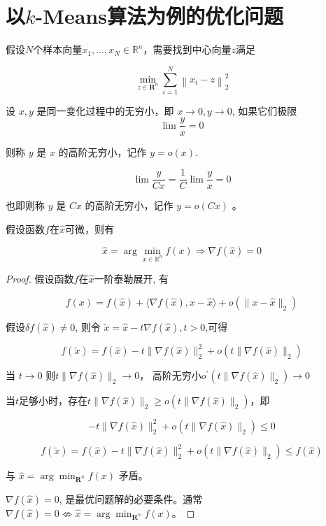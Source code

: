 \chapter{以$k$-Means算法为例的优化问题}
    
\begin{problem}
    \label{Problem:ClusteringCenter}
    假设$N$个样本向量$ x_{1}, \ldots, x_{N} \in \mathbb{R}^{n} $，需要找到中心向量$z$满足

    $$ \min _{z \in \mathbf{R}^{n}} \sum_{i=1}^{N}\left\|x_{i}-z\right\|_{2}^{2} $$
\end{problem}

\begin{definition}[高阶无穷小记号 $o$]
    设 $ x, y $ 是同一变化过程中的无穷小，即 $ x \rightarrow 0, y \rightarrow 0 $, 如果它们极限
$$
\lim \frac{y}{x}=0
$$

则称 $ y $ 是 $ x $ 的高阶无穷小，记作 $ y=o(x) $.
\end{definition}

\begin{corollary}
    $$ \lim \frac{y}{C x}=\frac{1}{C} \lim \frac{y}{x}=0 $$

    也即则称 $ y $ 是 $ C x $ 的高阶无穷小，记作 $ y=o(C x) $ 。
\end{corollary}

\begin{proposition}[优化求解的必要条件]
    假设函数$f$在$\hat{x}$可微，则有

    $$ \hat{x}=\arg \min _{x \in \mathbb{R}^{n}} f(x) \Rightarrow \nabla f(\hat{x})=0 $$
\end{proposition}

\begin{proof}
    假设函数$f$在$\hat{x}$一阶泰勒展开, 有

    $$ f(x)=f(\hat{x})+\langle\nabla f(\hat{x}), x-\hat{x}\rangle+o\left(\|x-\hat{x}\|_{2}\right) $$

    假设$ \delta f(\hat{x}) \neq 0 $, 则令 $ \tilde{x}=\hat{x}-t \nabla f(\hat{x}), t>0 $,可得

    $$ f(\tilde{x})=f(\hat{x})-t\|\nabla f(\hat{x})\|_{2}^{2}+o\left(t\|\nabla f(\hat{x})\|_{2}\right) $$

    当 $ t \rightarrow 0 $ 则$ t\|\nabla f(\hat{x})\|_{2} \rightarrow 0 $， 高阶无穷小$ {o }^{\prime}\left(t\|\nabla f(\hat{x})\|_{2}\right) \rightarrow 0 $

    当$t$足够小时，存在$ t\|\nabla f(\hat{x})\|_{2} \geq o\left(t\|\nabla f(\hat{x})\|_{2}\right) $，即

    $$ -t\|\nabla f(\hat{x})\|_{2}^{2}+o\left(t\|\nabla f(\hat{x})\|_{2}\right) \leq 0 $$

    $$ f(\tilde{x})=f(\hat{x})-t\|\nabla f(\hat{x})\|_{2}^{2}+o\left(t\|\nabla f(\hat{x})\|_{2}\right) \leq f(\hat{x}) $$

    与 $ \hat{x}=\arg \min _{\mathbf{R}^{n}} f(x) $ 矛盾。

    $ \nabla f(\widehat{x})=0 $, 是最优问题解的必要条件。通常 $ \nabla f(\hat{x})=0 \not \Leftrightarrow \hat{x}=\arg \min _{\mathbf{R}^{n}} f(x) $。
\end{proof}

